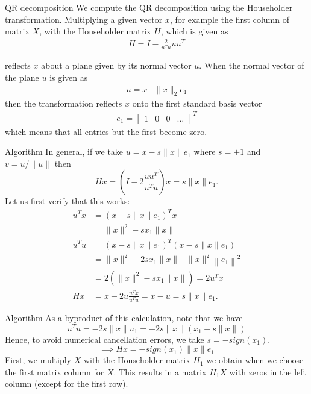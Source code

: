 \begin{frame}{QR decomposition}
    We compute the QR decomposition using the Householder transformation.
    Multiplying a given vector $x$, for example the first column of matrix $X$, with the Householder matrix $H$, which is given as
    \begin{align*}
        H=I-\frac{2}{u^{T} u} u u^{T}
    \end{align*}
    
    reflects $x$ about a plane given by its normal vector $u$. When the normal vector of the plane $u$ is given as
    \begin{align*}
        u=x-\|x\|_{2} e_{1}
    \end{align*}
    then the transformation reflects $x$ onto the first standard basis vector
    \begin{align*}
            e_{1}=\left[\begin{array}{llll}
            1 & 0 & 0 & \ldots
        \end{array}\right]^{T}
    \end{align*}
    which means that all entries but the first become zero.
\end{frame}

\begin{frame}{Algorithm}
    In general, if we take $u=x-s\|x\| e_{1}$ where $s=\pm 1$ and $v=u /\|u\|$ then
    $$
    H x=\left(I-2 \frac{u u^{T}}{u^{T} u}\right) x=s\|x\| e_{1} .
    $$
    Let us first verify that this works:
    \begin{align*}
    u^{T} x &=\left(x-s\|x\| e_{1}\right)^{T} x \\
    &=\|x\|^{2}-s x_{1}\|x\| \\
    u^{T} u &=\left(x-s\|x\| e_{1}\right)^{T}\left(x-s\|x\| e_{1}\right) \\
    &=\|x\|^{2}-2 s x_{1}\|x\|+\|x\|^{2}\left\|e_{1}\right\|^{2} \\
    &=2\left(\|x\|^{2}-s x_{1}\|x\|\right)=2 u^{T} x \\
    H x &=x-2 u \frac{u^{T} x}{u^{T} u}=x-u=s\|x\| e_{1} .
    \end{align*}
\end{frame}

\begin{frame}{Algorithm}
    As a byproduct of this calculation, note that we have
    $$
    u^{T} u=-2 s\|x\| u_{1} = -2 s\|x\| (x_1 - s\|x\|)
    $$
    Hence, to avoid numerical cancellation errors, we take $s = -sign(x_1)$.\\
    $$\implies Hx = -sign(x_1) \|x\| e_1$$
    First, we multiply $X$ with the Householder matrix $H_{1}$ we obtain when we choose the first matrix column for $X$. This results in a matrix $H_{1} X$ with zeros in the left column (except for the first row).
\end{frame}

